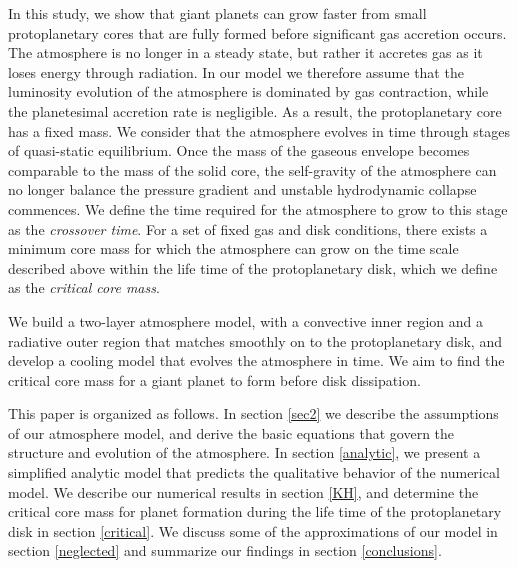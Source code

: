 \documentclass[apj]{emulateapj}
\begin{document}
In this study, we show that giant planets can grow faster from small protoplanetary cores that are fully formed before significant gas accretion occurs.  The atmosphere is no longer in a steady state, but rather it accretes gas as it loses energy through radiation. In our model we therefore assume that the luminosity evolution of the atmosphere is dominated by gas contraction, while the planetesimal accretion rate is negligible. As a result, the protoplanetary core has a fixed mass. We consider that the atmosphere evolves in time through stages of quasi-static equilibrium. Once the mass of the gaseous envelope becomes comparable to the mass of the solid core, the self-gravity of the atmosphere can no longer balance the pressure gradient and unstable hydrodynamic collapse commences. We define the time required for the atmosphere to grow to this stage as the \textit{crossover time}. For a set of fixed gas and disk conditions, there exists a minimum core mass for which the atmosphere can grow on the time scale described above within the life time of the protoplanetary disk, which we define as the \textit{critical core mass}. 

We build a two-layer atmosphere model, with a convective inner region and a radiative outer region that matches smoothly on to the protoplanetary disk, and develop a cooling model that evolves the atmosphere in time. We aim to find the critical core mass for a giant planet to form before disk dissipation.

This paper is organized as follows. In section \ref{sec2} we describe the assumptions of our atmosphere model, and derive the basic equations that govern the structure and evolution of the atmosphere. In section \ref{analytic}, we present a simplified analytic model that predicts the qualitative behavior of the numerical model. We describe our numerical results in section \ref{KH}, and determine the critical core mass for planet formation during the life time of the protoplanetary disk in section \ref{critical}.  We discuss some of the approximations of our model in section \ref{neglected} and summarize our findings in section \ref{conclusions}.




\end{document}
